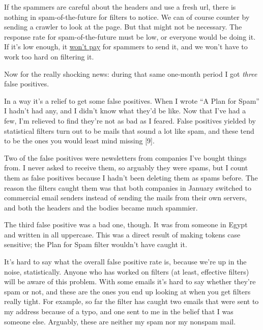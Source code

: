 If
                  the spammers are careful about the headers and use a fresh
                  url, there is nothing in spam-of-the-future for filters to
                  notice. We can of course counter by sending a crawler to look
                  at the page. But that might not be necessary. The response
                  rate for spam-of-the-future must be low, or everyone would be
                  doing it. If it's low enough, it
                  \href{http://www.paulgraham.com/wfks.html}{won't pay} for spammers to send it, and
                  we won't have to work too hard on filtering it.

Now
                  for the really shocking news: during that same one-month
                  period I got \emph{three} false positives.

In a way
                  it's a relief to get some false positives. When I wrote ``A
                  Plan for Spam'' I hadn't had any, and I didn't know what
                  they'd be like. Now that I've had a few, I'm relieved to find
                  they're not as bad as I feared. False positives yielded by
                  statistical filters turn out to be mails that sound a lot like
                  spam, and these tend to be the ones you would least mind
                  missing [9].

Two of the false positives were
                  newsletters from companies I've bought things from. I never
                  asked to receive them, so arguably they were spams, but I
                  count them as false positives because I hadn't been deleting
                  them as spams before. The reason the filters caught them was
                  that both companies in January switched to commercial email
                  senders instead of sending the mails from their own servers,
                  and both the headers and the bodies became much spammier.

The
                  third false positive was a bad one, though. It was from
                  someone in Egypt and written in all uppercase. This was a
                  direct result of making tokens case sensitive; the Plan for
                  Spam filter wouldn't have caught it.

It's hard to
                  say what the overall false positive rate is, because we're up
                  in the noise, statistically. Anyone who has worked on filters
                  (at least, effective filters) will be aware of this problem.
                  With some emails it's hard to say whether they're spam or not,
                  and these are the ones you end up looking at when you get
                  filters really tight. For example, so far the filter has
                  caught two emails that were sent to my address because of a
                  typo, and one sent to me in the belief that I was someone
                  else. Arguably, these are neither my spam nor my nonspam
                  mail.

